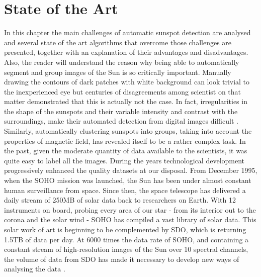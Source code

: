 \chapter{State of the Art}
\label{capitolo3}
\thispagestyle{empty}

\noindent In this chapter the main challenges of automatic sunspot detection are analysed and several state of the art algorithms that overcome those challenges are presented, together with an explanation of their advantages and disadvantages. Also, the reader will understand the reason why being able to automatically segment and group images of the Sun is so critically important. Manually drawing the contours of dark patches with white background can look trivial to the inexperienced eye but centuries of disagreements among scientist on that matter demonstrated that this is actually not the case. In fact, irregularities in the shape of the sunspots and their variable intensity and contrast with the surroundings, make their automated detection from digital images difficult \cite{curto2008automatic}. Similarly, automatically clustering sunspots into groups, taking into account the properties of magnetic field, has revealed itself to be a rather complex task. In the past, given the moderate quantity of data available to the scientists, it was quite easy to label all the images. During the years technological development progressively enhanced the quality datasets at our disposal. From December 1995, when the SOHO mission was launched, the Sun has been under almost constant human surveillance from space. Since then, the space telescope has delivered a daily stream of 250MB of solar data back to researchers on Earth. With 12 instruments on board, probing every area of our star - from its interior out to the corona and the solar wind - SOHO has compiled a vast library of solar data. This solar work of art is beginning to be complemented by SDO, which is returning 1.5TB of data per day. At 6000 times the data rate of SOHO, and containing a constant stream of high-resolution images of the Sun over 10 spectral channels, the volume of data from SDO has made it necessary to develop new ways of analysing the data \cite{esa-soho}. \\

